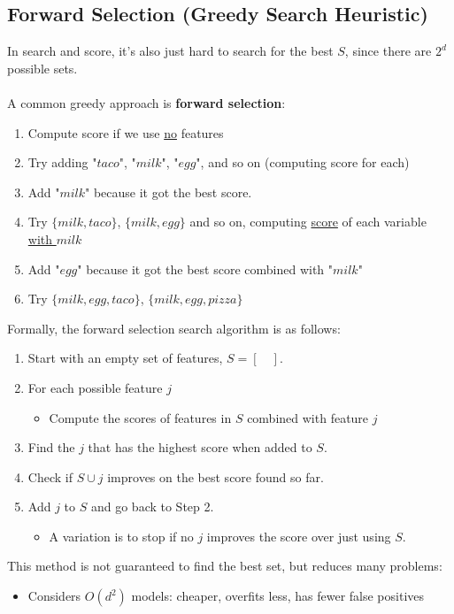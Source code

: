 \documentclass{article}
\def\blu#1{{\color{blu}#1}}
\def\gre#1{{\color{gre}#1}}
\def\red#1{{\color{red}#1}}
\theoremstyle{definition}
\begin{document}
\subsection*{Forward Selection (Greedy Search Heuristic)}
In search and score, it’s also just \red{hard to search for the best $ S $}, since there are \red{$ 2^d $ possible sets}. \\ \\
A common greedy approach is \textbf{\blu{forward selection}}:
\begin{enumerate}
	\item \gre{Compute score if we use \underline{no} features}
	\item \gre{Try adding "$ taco $", "$ milk $", "$ egg $", and so on (computing score for each)}
	\item Add "$ milk $" because it got the best score. 
	\item \gre{Try $ \{milk, taco\} $, $ \{milk, egg\} $ and so on, computing \underline{score} of each variable \underline{with $ milk $}}
	\item Add "$ egg $" because it got the best score combined with "$ milk $"
	\item \gre{Try $ \{milk, egg, taco\} $, $ \{milk, egg, pizza\} $}
\end{enumerate}
Formally, the \blu{forward selection} search algorithm is as follows:
\begin{enumerate}
	\item Start with an \gre{empty set} of features, $ S = [\quad] $.
	\item For each possible feature $ j $
	\begin{itemize}[label=-]
		\item \gre{Compute the scores of features in $ S $ combined with feature $ j $}
	\end{itemize}
	\item Find the $ j $ that has the highest score when added to $ S $.
	\item Check if {$S \cup j$} improves on the best score found so far.
	\item Add $ j $ to $ S $ and go back to Step 2.
	\begin{itemize}[label=-]
		\item A variation is to \red{stop if no $ j $ improves the score} over just using $ S $.
	\end{itemize}
\end{enumerate}
This method is \red{not guaranteed to find the best set}, \gre{but reduces many problems}:
\begin{itemize}
	\item Considers $ O(d^2) $ models: cheaper, overfits less, has fewer false positives
\end{itemize}
\end{document}
